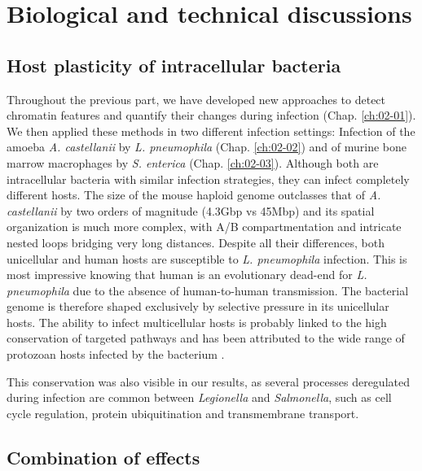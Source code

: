 
\chapter{Biological and technical discussions} %
\label{ch:03-01} %

\section{Host plasticity of intracellular bacteria}

Throughout the previous part, we have developed new approaches to detect chromatin features and quantify their changes during infection (Chap. \ref{ch:02-01}). We then applied these methods in two different infection settings: Infection of the amoeba \textit{A. castellanii} by \textit{L. pneumophila} (Chap. \ref{ch:02-02}) and of murine bone marrow macrophages by \textit{S. enterica} (Chap. \ref{ch:02-03}). Although both are intracellular bacteria with similar infection strategies, they can infect completely different hosts. The size of the mouse haploid genome outclasses that of \textit{A. castellanii} by two orders of magnitude (4.3Gbp vs 45Mbp) and its spatial organization is much more complex, with A/B compartmentation and intricate nested loops bridging very long distances. Despite all their differences, both unicellular and human hosts are susceptible to \textit{L. pneumophila} infection. This is most impressive knowing that human is an evolutionary dead-end for \textit{L. pneumophila} due to the absence of human-to-human transmission. The bacterial genome is therefore shaped exclusively by selective pressure in its unicellular hosts. The ability to infect multicellular hosts is probably linked to the high conservation of targeted pathways and has been attributed to the wide range of protozoan hosts infected by the bacterium \cite{molofskyDifferentiateThriveLessons2004}.

This conservation was also visible in our results, as several processes deregulated during infection are common between \textit{Legionella} and \textit{Salmonella}, such as cell cycle regulation, protein ubiquitination and transmembrane transport.


\section{Combination of effects}

